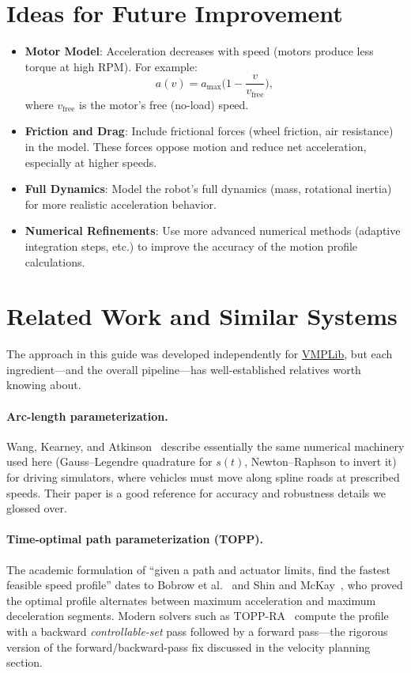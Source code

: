 \documentclass[11pt]{article}
\begin{document}
\section{Ideas for Future Improvement}

\begin{itemize}
  \item \textbf{Motor Model}: Acceleration decreases with speed (motors produce less torque at high RPM). For example:
  \[
    a(v) = a_{\text{max}}\Big(1 - \frac{v}{v_{\text{free}}}\Big),
  \]
  where $v_{\text{free}}$ is the motor’s free (no-load) speed.
  \item \textbf{Friction and Drag}: Include frictional forces (wheel friction, air resistance) in the model. These forces oppose motion and reduce net acceleration, especially at higher speeds.
  \item \textbf{Full Dynamics}: Model the robot’s full dynamics (mass, rotational inertia) for more realistic acceleration behavior.
  \item \textbf{Numerical Refinements}: Use more advanced numerical methods (adaptive integration steps, etc.) to improve the accuracy of the motion profile calculations.
\end{itemize}

\section{Related Work and Similar Systems}
\label{sec:related}

The approach in this guide was developed independently for \href{https://github.com/SerrialError/vmplib}{VMPLib}, but each ingredient---and the overall pipeline---has well-established relatives worth knowing about.

\paragraph{Arc-length parameterization.} Wang, Kearney, and Atkinson~\cite{wang} describe essentially the same numerical machinery used here (Gauss--Legendre quadrature for \(s(t)\), Newton--Raphson to invert it) for driving simulators, where vehicles must move along spline roads at prescribed speeds. Their paper is a good reference for accuracy and robustness details we glossed over.

\paragraph{Time-optimal path parameterization (TOPP).} The academic formulation of ``given a path and actuator limits, find the fastest feasible speed profile'' dates to Bobrow et al.~\cite{bobrow} and Shin and McKay~\cite{shinmckay}, who proved the optimal profile alternates between maximum acceleration and maximum deceleration segments. Modern solvers such as TOPP-RA~\cite{toppra} compute the profile with a backward \emph{controllable-set} pass followed by a forward pass---the rigorous version of the forward/backward-pass fix discussed in the velocity planning section.
\end{document}
